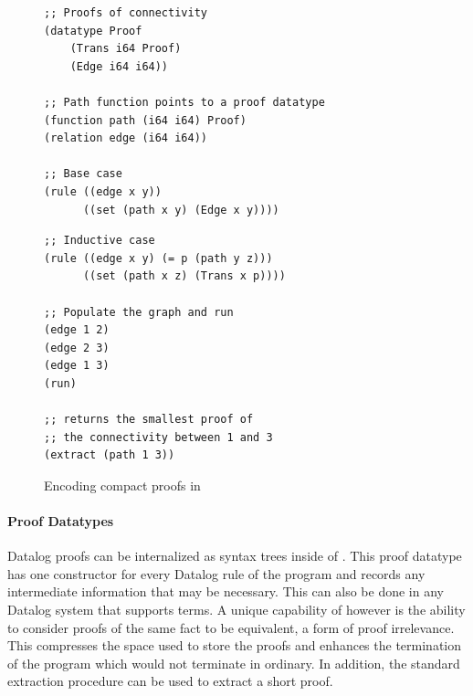 \begin{figure}
\begin{minipage}[t]{0.48\linewidth}
    \begin{lstlisting}[language=egglog]
;; Proofs of connectivity
(datatype Proof
    (Trans i64 Proof)
    (Edge i64 i64))

;; Path function points to a proof datatype
(function path (i64 i64) Proof)
(relation edge (i64 i64))

;; Base case
(rule ((edge x y))
      ((set (path x y) (Edge x y))))
\end{lstlisting}
\end{minipage}
\hfill
\begin{minipage}[t]{0.48\linewidth}
    \begin{lstlisting}[language=egglog]
;; Inductive case
(rule ((edge x y) (= p (path y z)))
      ((set (path x z) (Trans x p))))

;; Populate the graph and run
(edge 1 2)
(edge 2 3)
(edge 1 3)
(run)

;; returns the smallest proof of
;; the connectivity between 1 and 3
(extract (path 1 3))
    \end{lstlisting}
    \end{minipage}
    \caption{Encoding compact proofs in \egglog}
    \label{fig:proofs:egglog}
\end{figure}


\paragraph{Proof Datatypes}
Datalog proofs can be internalized as syntax trees inside of \egglog. This proof
datatype has one constructor for every Datalog rule of the program and records
any intermediate information that may be necessary. This can also be done in any
Datalog system that supports terms. A unique capability of \egglog however is the
ability to consider proofs of the same fact to be equivalent, a form of proof
irrelevance. This compresses the space used to store the proofs and enhances the
termination of the program which would not terminate in ordinary. In addition,
the standard extraction procedure can be used to extract a short proof.

